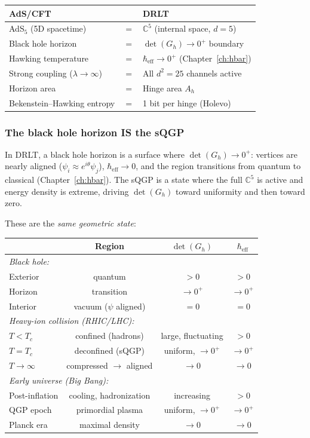 \begin{center}
\begin{tabular}{lcl}
\hline
AdS/CFT & & DRLT \\
\hline
AdS$_5$ (5D spacetime) & $=$ & $\mathbb{C}^5$ (internal space, $d = 5$) \\
Black hole horizon & $=$ & $\det(G_h) \to 0^+$ boundary \\
Hawking temperature & $=$ & $\hbar_\text{eff} \to 0^+$ (Chapter~\ref{ch:hbar}) \\
Strong coupling ($\lambda \to \infty$) & $=$ & All $d^2 = 25$ channels active \\
Horizon area & $=$ & Hinge area $A_h$ \\
Bekenstein--Hawking entropy & $=$ & 1 bit per hinge (Holevo) \\
\hline
\end{tabular}
\end{center}

\subsubsection{The black hole horizon IS the sQGP}

In DRLT, a black hole horizon is a surface where $\det(G_h) \to 0^+$: vertices are nearly aligned ($\psi_i \approx e^{i\theta}\psi_j$), $\hbar_\text{eff} \to 0$, and the region transitions from quantum to classical (Chapter~\ref{ch:hbar}). The sQGP is a state where the full $\mathbb{C}^5$ is active and energy density is extreme, driving $\det(G_h)$ toward uniformity and then toward zero.

These are the \emph{same geometric state}:

\begin{center}
\begin{tabular}{lccc}
\hline
& Region & $\det(G_h)$ & $\hbar_\text{eff}$ \\
\hline
\multicolumn{4}{l}{\emph{Black hole:}} \\
\quad Exterior & quantum & $> 0$ & $> 0$ \\
\quad Horizon & transition & $\to 0^+$ & $\to 0^+$ \\
\quad Interior & vacuum ($\psi$ aligned) & $= 0$ & $= 0$ \\
\hline
\multicolumn{4}{l}{\emph{Heavy-ion collision (RHIC/LHC):}} \\
\quad $T < T_c$ & confined (hadrons) & large, fluctuating & $> 0$ \\
\quad $T = T_c$ & deconfined (sQGP) & uniform, $\to 0^+$ & $\to 0^+$ \\
\quad $T \to \infty$ & compressed $\to$ aligned & $\to 0$ & $\to 0$ \\
\hline
\multicolumn{4}{l}{\emph{Early universe (Big Bang):}} \\
\quad Post-inflation & cooling, hadronization & increasing & $> 0$ \\
\quad QGP epoch & primordial plasma & uniform, $\to 0^+$ & $\to 0^+$ \\
\quad Planck era & maximal density & $\to 0$ & $\to 0$ \\
\hline
\end{tabular}
\end{center}

